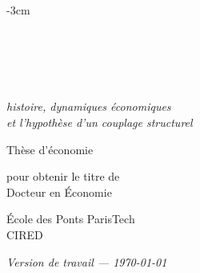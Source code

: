 \begin{titlepage}
\begin{addmargin}[-1cm]{-3cm}
\begin{center}
\large

\hfill

\vfill

\begingroup
\color{Maroon} \\ \bigskip
\endgroup

 \\[0.4em]
 \\ \medskip

{\large\itshape histoire, dynamiques économiques\\
et l'hypothèse d'un couplage structurel\par}

\vfill

{\large Thèse d'économie\par}
\smallskip
{\large pour obtenir le titre de\\
Docteur en Économie\par}

\vfill

\smallskip
{\large École des Ponts ParisTech\\
CIRED\par}

\bigskip

{\large\color{Maroon} \textit{Version de travail --- \today}\par}

\vfill

\end{center}
\end{addmargin}
\end{titlepage}
